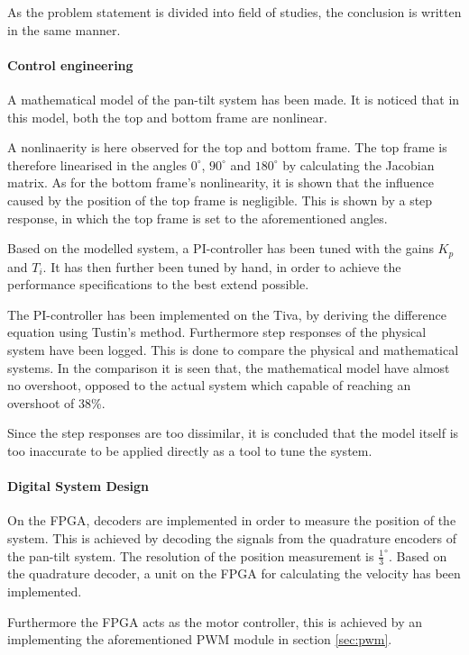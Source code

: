 \documentclass[../../main]{subfiles}
\begin{document}
As the problem statement is divided into field of studies, the conclusion is written in the same manner.

\paragraph{Control engineering}

A mathematical model of the pan-tilt system has been made.
It is noticed that in this model, both the top and bottom frame are nonlinear.

A nonlinaerity is here observed for the top and bottom frame.
The top frame is therefore linearised in the angles $0^\circ$, $90^\circ$ and $180^\circ$ by calculating the Jacobian matrix.
As for the bottom frame's nonlinearity, it is shown that the influence caused by the position of the top frame is negligible. This is shown by a step response, in which the top frame is set to the aforementioned angles.



Based on the modelled system, a PI-controller has been tuned with the gains $K_p$ and $T_i$. It has then further been tuned by hand, in order to achieve the performance specifications to the best extend possible.

The PI-controller has been implemented on the Tiva, by deriving the difference equation using Tustin's method.
Furthermore step responses of the physical system have been logged. This is done to compare the physical and mathematical systems.
In the comparison it is seen that, the mathematical model have almost no overshoot, opposed to the actual system which capable of reaching an overshoot of 38\%.

Since the step responses are too dissimilar, it is concluded that the model itself is too inaccurate to be applied directly as a tool to tune the system. 

\paragraph{Digital System Design}
On the FPGA, decoders are implemented in order to measure the position of the system.
This is achieved by decoding the signals from the quadrature encoders of the pan-tilt system.
The resolution of the position measurement is $\frac{1}{3}^\circ$.
Based on the quadrature decoder, a unit on the FPGA for calculating the velocity has been implemented.

Furthermore the FPGA acts as the motor controller, this is achieved by an implementing the aforementioned PWM module in section \ref{sec:pwm}.
\end{document}
